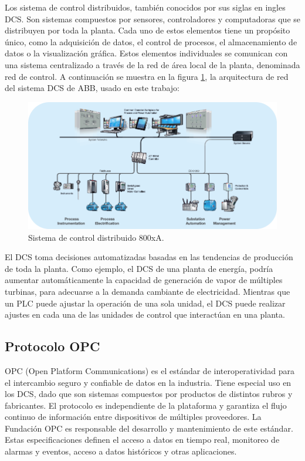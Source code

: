 Los sistema de control distribuidos, también conocidos por sus siglas en ingles DCS. Son sistemas compuestos por sensores, controladores y computadoras que se distribuyen por toda la planta. Cada uno de estos elementos tiene un propósito único, como la adquisición de datos, el control de procesos, el almacenamiento de datos o la visualización gráfica. Estos elementos individuales se comunican con una sistema centralizado a través de la red de área local de la planta, denominada red de control. A continuación se muestra en la figura \ref{fig:800xA}, la arquitectura de red del sistema DCS de ABB, usado en este trabajo:

\begin{figure}[htpb]
	\centering
	\includegraphics[width=\textwidth]{./Figures/800xA.png}
	\caption{Sistema de control distribuido 800xA\protect\footnotemark.}
	\label{fig:800xA}
\end{figure}


El DCS toma decisiones automatizadas basadas en las tendencias de producción de toda la planta. Como ejemplo, el DCS de una planta de energía, podría aumentar automáticamente la capacidad de generación de vapor de múltiples turbinas, para adecuarse a la demanda cambiante de electricidad. Mientras que un PLC puede ajustar la operación de una sola unidad, el DCS puede realizar ajustes en cada una de las unidades de control que interactúan en una planta.

\subsection{Protocolo OPC}

OPC (Open Platform Communications) es el estándar de interoperatividad para el intercambio seguro y confiable de datos en la industria. Tiene especial uso en los DCS, dado que son sistemas compuestos por productos de distintos rubros y fabricantes. El protocolo es independiente de la plataforma y garantiza el flujo continuo de información entre dispositivos de múltiples proveedores. La Fundación OPC es responsable del desarrollo y mantenimiento de este estándar. Estas especificaciones definen el acceso a datos en tiempo real, monitoreo de alarmas y eventos, acceso a datos históricos y otras aplicaciones. 

